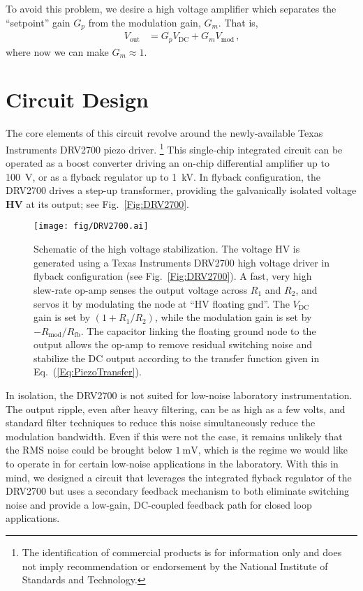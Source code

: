 \documentclass[aip,rsi,reprint]{revtex4-1} %
\begin{document}
To avoid this problem, we desire a high voltage amplifier which separates the ``setpoint'' gain $G_p$ from the modulation gain, $G_m$. That is,
\begin{align}
  V_{\text{out}} &= G_p V_{\text{DC}} + G_m V_{\text{mod}}\, \text{,}
  \label{Eq:PiezoTransfer}
\end{align}
where now we can make $G_m \approx 1$.

\section{Circuit Design}
\label{Sec:Circuit}

The core elements of this circuit revolve around the newly-available Texas Instruments DRV2700 piezo driver.
\footnote{The identification of commercial products is for information only and does not imply recommendation or endorsement by the National Institute of Standards and Technology.}
This single-chip integrated circuit can be operated as a boost converter driving an on-chip differential amplifier up to \SI{100}{\volt}, or as a flyback regulator up to \SI{1}{\kilo\volt}. 
In flyback configuration, the DRV2700 drives a step-up transformer, providing the galvanically isolated voltage $\mathbf{HV}$ at its output; see Fig.~\ref{Fig:DRV2700}.

\begin{figure*}[t]
\texttt{[image: fig/DRV2700.ai]}
\caption{Schematic of the high voltage stabilization.
The voltage HV is generated using a Texas Instruments DRV2700 high voltage driver in flyback configuration (see Fig.~\ref{Fig:DRV2700}).
A fast, very high slew-rate op-amp senses the output voltage across $R_1$ and $R_2$, and servos it by modulating the node at ``HV floating gnd''.
The $V_{\text{DC}}$ gain is set by $\left(1+R_1/R_2\right)$, while the modulation gain is set by $-R_{\text{mod}}/R_{\text{fb}}$.
The capacitor linking the floating ground node to the output allows the op-amp to remove residual switching noise and stabilize the DC output according to the transfer function given in Eq.~(\ref{Eq:PiezoTransfer}). \label{Fig:PiezoCircuit}}
\end{figure*}

In isolation, the DRV2700 is not suited for low-noise laboratory instrumentation. 
The output ripple, even after heavy filtering, can be as high as a few volts, and standard filter techniques to reduce this noise simultaneously reduce the modulation bandwidth.
Even if this were not the case, it remains unlikely that the RMS noise could be brought below $\SI{1}{\milli\volt}$, which is the regime we would like to operate in for certain low-noise applications in the laboratory.
With this in mind, we designed a circuit that leverages the integrated flyback regulator of the DRV2700 but uses a secondary feedback mechanism to both eliminate switching noise and provide a low-gain, DC-coupled feedback path for closed loop applications.
\end{document}
